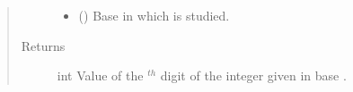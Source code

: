 \documentclass[letterpaper,10pt,english]{sphinxmanual}
\begin{document}
\begin{fulllineitems}
\begin{quote}
\begin{description}
\begin{itemize}
\item {} 
 () \textendash{} Base in which  is studied.

\end{itemize}

\item[{Returns}] \leavevmode
int \textendash{} Value of the  \(^{th}\) digit of the integer  given 
in base .

\end{description}\end{quote}

\end{fulllineitems}

\end{document}
